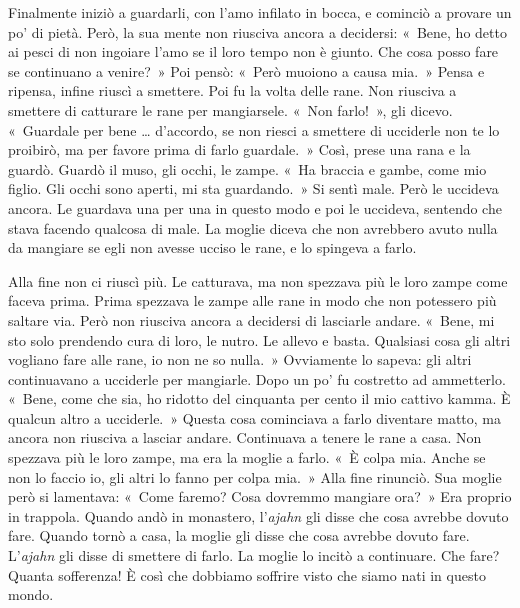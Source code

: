Finalmente iniziò a guardarli, con l'amo infilato in bocca, e
cominciò a provare un po' di pietà. Però, la sua mente non riusciva
ancora a decidersi: «~Bene, ho detto ai pesci di non ingoiare l'amo se
il loro tempo non è giunto. Che cosa posso fare se continuano a
venire?~» Poi pensò: «~Però muoiono a causa mia.~» Pensa e ripensa,
infine riuscì a smettere. Poi fu la volta delle rane. Non riusciva a
smettere di catturare le rane per mangiarsele. «~Non farlo!~», gli
dicevo. «~Guardale per bene \ldots{} d'accordo, se non riesci a smettere di
ucciderle non te lo proibirò, ma per favore prima di farlo guardale.~»
Così, prese una rana e la guardò. Guardò il muso, gli occhi, le zampe.
«~Ha braccia e gambe, come mio figlio. Gli occhi sono aperti, mi sta
guardando.~» Si sentì male. Però le uccideva ancora. Le guardava una per
una in questo modo e poi le uccideva, sentendo che stava facendo
qualcosa di male. La moglie diceva che non avrebbero avuto nulla da
mangiare se egli non avesse ucciso le rane, e lo spingeva a farlo.

Alla fine non ci riuscì più. Le catturava, ma non spezzava più le loro
zampe come faceva prima. Prima spezzava le zampe alle rane in modo che
non potessero più saltare via. Però non riusciva ancora a decidersi di
lasciarle andare. «~Bene, mi sto solo prendendo cura di loro, le nutro.
Le allevo e basta. Qualsiasi cosa gli altri vogliano fare alle rane, io
non ne so nulla.~» Ovviamente lo sapeva: gli altri continuavano a
ucciderle per mangiarle. Dopo un po' fu costretto ad ammetterlo. «~Bene,
come che sia, ho ridotto del cinquanta per cento il mio cattivo
kamma. È qualcun altro a ucciderle.~» Questa cosa cominciava a
farlo diventare matto, ma ancora non riusciva a lasciar andare.
Continuava a tenere le rane a casa. Non spezzava più le loro zampe, ma
era la moglie a farlo. «~È colpa mia. Anche se non lo faccio io, gli
altri lo fanno per colpa mia.~» Alla fine rinunciò. Sua moglie però si
lamentava: «~Come faremo? Cosa dovremmo mangiare ora?~» Era proprio in
trappola. Quando andò in monastero, l'\emph{ajahn} gli disse che cosa
avrebbe dovuto fare. Quando tornò a casa, la moglie gli disse che cosa
avrebbe dovuto fare. L'\emph{ajahn} gli disse di smettere di farlo. La
moglie lo incitò a continuare. Che fare? Quanta sofferenza! È così che
dobbiamo soffrire visto che siamo nati in questo mondo.

